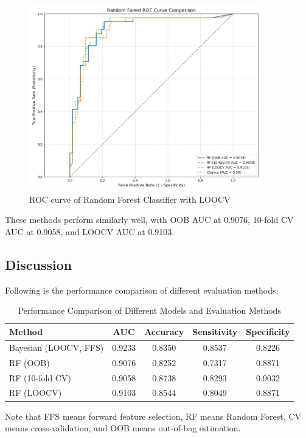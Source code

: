 \documentclass[12pt,a4paper]{article}
\begin{document}
\begin{figure}[H]
    \centering
    \includegraphics[width=0.9\textwidth]{src/roc_curve_rf_comparison.png}
    \caption{ROC curve of Random Forest Classifier with LOOCV}
    \label{fig:roc_rf}
\end{figure}

These methods perform similarly well, with OOB AUC at 0.9076, 10-fold CV AUC at 0.9058, and LOOCV AUC at 0.9103.



\subsection{Discussion}

Following is the performance comparison of different evaluation methods:
\begin{table}[H]
    \centering
    \caption{Performance Comparison of Different Models and Evaluation Methods}
    \label{tab:performance_comparison}
    \begin{tabular}{lcccc}
        \toprule
        \textbf{Method} & \textbf{AUC} & \textbf{Accuracy} & \textbf{Sensitivity} & \textbf{Specificity} \\
        \midrule
        Bayesian (LOOCV, FFS) & 0.9233 & 0.8350 & 0.8537 & 0.8226 \\
        RF (OOB)             & 0.9076 & 0.8252 & 0.7317 & 0.8871 \\
        RF (10-fold CV)      & 0.9058 & 0.8738 & 0.8293 & 0.9032 \\
        RF (LOOCV)           & 0.9103 & 0.8544 & 0.8049 & 0.8871 \\
        \bottomrule
    \end{tabular}
\end{table}
Note that FFS means forward feature selection, RF means Random Forest, CV means cross-validation, and OOB means out-of-bag estimation.
\end{document}
